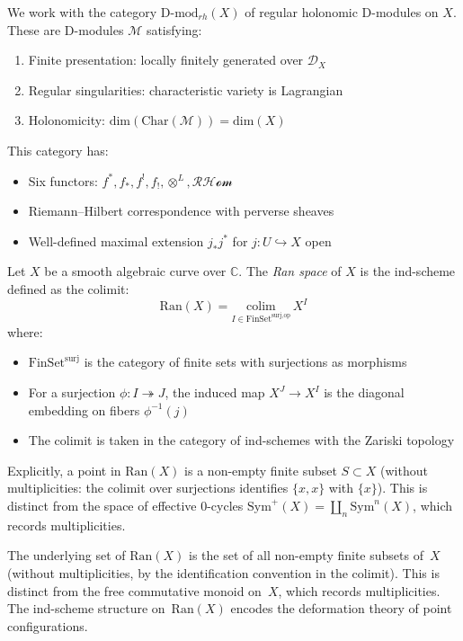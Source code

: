 \begin{definition}
We work with the category $\text{D-mod}_{rh}(X)$ of regular holonomic D-modules on $X$. 
These are D-modules $\mathcal{M}$ satisfying:
\begin{enumerate}
\item Finite presentation: locally finitely generated over $\mathcal{D}_X$
\item Regular singularities: characteristic variety is Lagrangian
\item Holonomicity: $\text{dim}(\text{Char}(\mathcal{M})) = \text{dim}(X)$
\end{enumerate}
This category has:
\begin{itemize}
\item Six functors: $f^*, f_*, f^!, f_!, \otimes^L, \mathcal{RHom}$
\item Riemann--Hilbert correspondence with perverse sheaves
\item Well-defined maximal extension $j_*j^*$ for $j: U \hookrightarrow X$ open
\end{itemize}
\end{definition}

\begin{definition}\label{def:ran-precise}
Let $X$ be a smooth algebraic curve over $\mathbb{C}$. The \emph{Ran space} of $X$ is the ind-scheme 
defined as the colimit:
\[
\text{Ran}(X) = \underset{I \in \text{FinSet}^{\text{surj,op}}}{\text{colim}} \, X^I
\]
where:
\begin{itemize}
\item $\text{FinSet}^{\text{surj}}$ is the category of finite sets with surjections as morphisms
\item For a surjection $\phi: I \twoheadrightarrow J$, the induced map $X^J \to X^I$ is the diagonal 
embedding on fibers $\phi^{-1}(j)$
\item The colimit is taken in the category of ind-schemes with the Zariski topology
\end{itemize}
Explicitly, a point in $\text{Ran}(X)$ is a non-empty finite subset $S \subset X$ (without multiplicities: the colimit over surjections identifies $\{x, x\}$ with $\{x\}$).  This is distinct from the space of effective 0-cycles $\text{Sym}^+(X) = \coprod_n \text{Sym}^n(X)$, which records multiplicities.
\end{definition}
 
\begin{remark}
The underlying set of $\text{Ran}(X)$ is the set of all non-empty finite subsets of~$X$
(without multiplicities, by the identification convention in the colimit).  This is distinct from
the free commutative monoid on~$X$, which records multiplicities.  The ind-scheme structure
on~$\text{Ran}(X)$ encodes the deformation theory of point configurations.
\end{remark}
 
